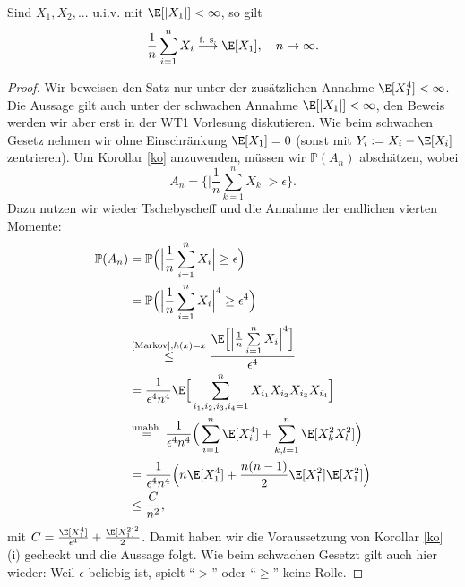 \begin{satz}\label{sGGZ}
	Sind $X_1,X_2,...$ u.i.v. mit $\E[|X_1|] < \infty$, so gilt \[ \frac{1}{n} \sum\limits_{i=1}^{n} X_i \overset{\text{f. s.}}{\longrightarrow} \E[X_1], \quad n \to \infty. \]
\end{satz}


\begin{proof}
	Wir beweisen den Satz nur unter der zus\"atzlichen Annahme $\E[X_1^4] < \infty$. Die Aussage gilt auch unter der schwachen Annahme $\E[|X_1|]<\infty$, den Beweis werden wir aber erst in der WT1 Vorlesung diskutieren. Wie beim schwachen Gesetz nehmen wir ohne Einschr\"ankung $\E[X_1] = 0$ (sonst mit $Y_i:=X_i-\E[X_i]$ zentrieren). Um Korollar \ref{ko} anzuwenden, m\"ussen wir $\mathbb P(A_n)$ absch\"atzen, wobei 
	\[ A_n = \Big\{ \Big| \frac{1}{n} \sum\limits_{k=1}^{n} X_k \Big| >\epsilon \Big\}. \] 
	Dazu nutzen wir wieder Tschebyscheff und die Annahme der endlichen vierten Momente:
	\begin{align*}
		\mathbb{P}(A_n) &= \mathbb{P}\Big(\Big| \frac{1}{n} \sum\limits_{i=1}^{n} X_i \Big| \geq \epsilon \Big)\\
		& = \mathbb{P}\Big(\Big| \frac{1}{n} \sum\limits_{i=1}^{n} X_i \Big|^4 \geq \epsilon^4 \Big)\\
		&\overset{\text{\ref{Markov}}, h(x)=x}{\leq} \frac{\E\Big[ \Big| \frac{1}{n} \sum\limits_{i=1}^{n} X_i \Big|^4\Big]}{\epsilon^4}\\
		& = \frac{1}{\epsilon^4 n^4}\E\Big[\sum\limits_{i_1,i_2,i_3,i_4=1}^{n} X_{i_1}  X_{i_2}  X_{i_3}  X_{i_4}  \Big] \\
		&\overset{\text{unabh.}}{=}  \frac{1}{\epsilon^4 n^4} \Big( \sum\limits_{i=1}^{n} \E[X_i^4]+ \sum\limits_{k,l=1}^{n} \E[X_k^2  X_l^2] \Big)\\
		&= \frac{1}{\epsilon^4n^4} \Big(n  \E[X_1^4] +\frac{n(n-1)}{2} \E[X_1^2]  \E[X_1^2] \Big)\\
		&\leq \frac{C}{n^2},
	\end{align*}
	mit $C=\frac{\E[X_1^4]}{\epsilon^4}+\frac{\E[X_1^2]^2}{2}$. Damit haben wir die Voraussetzung von Korollar \ref{ko} (i) gecheckt und die Aussage folgt. Wie beim schwachen Gesetzt gilt auch hier wieder: Weil $\epsilon$ beliebig ist, spielt \enquote{$>$} oder \enquote{$\geq$} keine Rolle.
	\end{proof}
